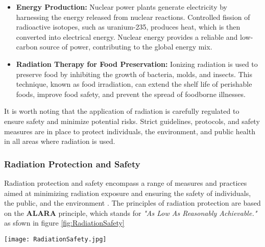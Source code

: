 \documentclass[../introduction.tex]{subfiles}
\begin{document}
\begin{itemize}
            \item \textbf{Energy Production:} Nuclear power plants generate electricity by harnessing the energy released from nuclear reactions. 
            Controlled fission of radioactive isotopes, such as uranium-235, produces heat, which is then converted into electrical energy. 
            Nuclear energy provides a reliable and low-carbon source of power, contributing to the global energy mix.

            \item \textbf{Radiation Therapy for Food Preservation:} Ionizing radiation is used to preserve food by inhibiting the growth of bacteria, 
            molds, and insects. This technique, known as food irradiation, can extend the shelf life of perishable foods, improve food safety, and 
            prevent the spread of foodborne illnesses.

        \end{itemize}

        It is worth noting that the application of radiation is carefully regulated to ensure safety and minimize potential risks. 
        Strict guidelines, protocols, and safety measures are in place to protect individuals, the environment, and public health in all areas 
        where radiation is used.
    
    \subsubsection*{\large Radiation Protection and Safety}
        Radiation protection and safety encompass a range of measures and practices aimed at minimizing radiation exposure and ensuring the 
        safety of individuals, the public, and the environment \cite{b3}. The principles of radiation protection are based on the \textbf{ALARA} principle, 
        which stands for \textit{"As Low As Reasonably Achievable."} as sfown in figure \ref{fig:RadiationSafety}\

        \begin{Figure}
            \centering
            \texttt{[image: RadiationSafety.jpg]}
            \label{fig:RadiationSafety}
        \end{Figure}

        
        
\end{document}
